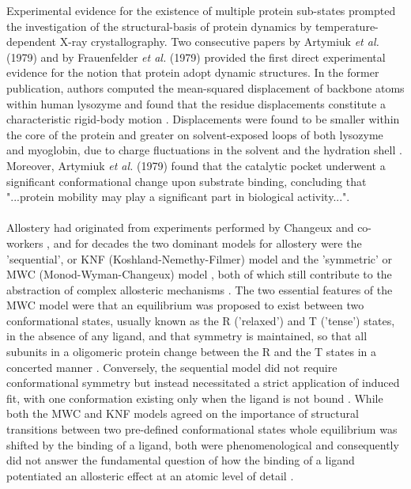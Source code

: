 %
%
Experimental evidence for the existence of multiple protein sub-states prompted the investigation of the structural-basis of protein dynamics by temperature-dependent X-ray crystallography. Two consecutive papers by Artymiuk \textit{et al.} (1979) \cite{Artymiuk:1979aa} and by Frauenfelder \textit{et al.} (1979) \cite{Frauenfelder:1979aa} provided the first direct experimental evidence for the notion that protein adopt dynamic structures. In the former publication, authors computed the mean-squared displacement of backbone atoms within human lysozyme and found that the residue displacements constitute a characteristic rigid-body motion \cite{Artymiuk:1979aa}. Displacements were found to be smaller within the core of the protein and greater on solvent-exposed loops of both lysozyme and myoglobin, due to charge fluctuations in the solvent and the hydration shell \cite{Artymiuk:1979aa}. Moreover, Artymiuk \textit{et al.} (1979) \cite{Artymiuk:1979aa} found that the catalytic pocket underwent a significant conformational change upon substrate binding, concluding that "...protein mobility may play a significant part in biological activity...". 
%
%
\\\\
%
%
Allostery had originated from experiments performed by Changeux and co-workers \cite{CHANGEUX:1961aa,MONOD:1963aa,MONOD:1965aa}, and for decades the two dominant models for allostery were the 'sequential', or KNF (Koshland-Nemethy-Filmer) model \cite{Koshland:1966aa} and the 'symmetric' or MWC (Monod-Wyman-Changeux) model \cite{MONOD:1965aa}, both of which still contribute to the abstraction of complex allosteric mechanisms \cite{Changeux:2013aa}. The two essential features of the MWC model were that an equilibrium was proposed to exist between two conformational states, usually known as the R ('relaxed') and T ('tense') states, in the absence of any ligand, and that symmetry is maintained, so that all subunits in a oligomeric protein change between the R and the T states in a concerted manner \cite{Cornish-Bowden:2014aa}. Conversely, the sequential model did not require conformational symmetry but instead necessitated a strict application of induced fit, with one conformation existing only when the ligand is not bound \cite{Cornish-Bowden:2014aa}. While both the MWC and KNF models agreed on the importance of structural transitions between two pre-defined conformational states whole equilibrium was shifted by the binding of a ligand, both were phenomenological and consequently did not answer the fundamental question of how the binding of a ligand potentiated an allosteric effect at an atomic level of detail \cite{Cui:2008aa}.
